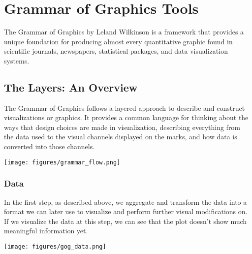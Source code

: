 \chapter{Grammar of Graphics Tools}
The Grammar of Graphics by Leland Wilkinson is a framework that provides a unique foundation for producing almost every quantitative graphic found in scientific journals, newspapers, statistical packages, and data visualization systems.

\section*{The Layers: An Overview}
\begin{minipage}[t]{0.6\textwidth}
    \vspace{0pt}
    The Grammar of Graphics follows a layered approach to describe and construct visualizations or graphics. 
    It provides a common language for thinking about the ways that design choices are made in visualization, describing everything from the data used to the visual channels displayed on the marks, and how data is converted into those channels.
    \hspace{1cm}
\end{minipage}
\begin{minipage}[t]{0.4\textwidth}
    \vspace{0pt}
    \texttt{[image: figures/grammar\_flow.png]}
\end{minipage}
\captionsetup{justification=centering}

\vspace{-3mm}

\subsection*{Data}
\vspace{-2mm}
\begin{minipage}[t]{0.7\textwidth}
    In the first step, as described above, we aggregate and transform the data into a format we can later use to visualize and 
    perform further visual modifications on. 
    If we visualize the data at this step, we can see that the plot doesn't show much meaningful information yet.
    \hspace{1cm}
\end{minipage}
\begin{minipage}[t]{0.3\textwidth}
    \vspace{-20pt}
    \texttt{[image: figures/gog\_data.png]}
\end{minipage}


